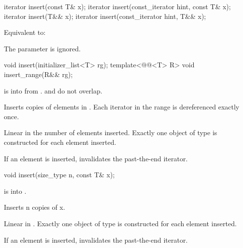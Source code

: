 %
\begin{itemdecl}
iterator insert(const T& x);
iterator insert(const_iterator hint, const T& x);
iterator insert(T&& x);
iterator insert(const_iterator hint, T&& x);
\end{itemdecl}

\begin{itemdescr}
\pnum
\effects
Equivalent to: 
\begin{note}
The  parameter is ignored.
\end{note}
\end{itemdescr}

%
\begin{itemdecl}
void insert(initializer_list<T> rg);
template<@@<T> R>
  void insert_range(R&& rg);
\end{itemdecl}

\begin{itemdescr}
\pnum
\expects
{} is  into 
from .
 and  do not overlap.

\pnum
\effects
Inserts copies of elements in .
Each iterator in the range  is dereferenced exactly once.

\pnum
\complexity
Linear in the number of elements inserted.
Exactly one object of type  is constructed for each element inserted.

\pnum
\remarks
If an element is inserted, invalidates the past-the-end iterator.
\end{itemdescr}

%
\begin{itemdecl}
void insert(size_type n, const T& x);
\end{itemdecl}

\begin{itemdescr}
\pnum
\expects
{} is  into .

\pnum
\effects
Inserts n copies of x.

\pnum
\complexity
Linear in .
Exactly one object of type  is constructed for each element inserted.

\pnum
\remarks
If an element is inserted, invalidates the past-the-end iterator.
\end{itemdescr}

